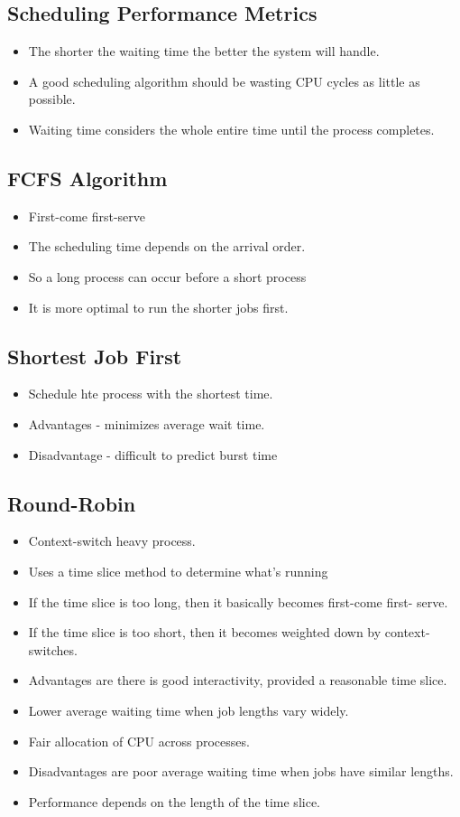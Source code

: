 \documentclass[]{article}
\begin{document}
\subsection{Scheduling Performance Metrics}
\begin{itemize}
\item The shorter the waiting time the better the system will handle.
\item A good scheduling algorithm should be wasting CPU cycles as little as
possible.
\item Waiting time considers the whole entire time until the process completes.
\end{itemize}

\subsection{FCFS Algorithm}
\begin{itemize}
\item First-come first-serve
\item The scheduling time depends on the arrival order.
\item So a long process can occur before a short process
\item It is more optimal to run the shorter jobs first.
\end{itemize}

\subsection{Shortest Job First}
\begin{itemize}
\item Schedule hte process with the shortest time.
\item Advantages - minimizes average wait time.
\item Disadvantage - difficult to predict burst time
\end{itemize}

\subsection{Round-Robin}
\begin{itemize}
\item Context-switch heavy process.
\item Uses a time slice method to determine what's running
\item If the time slice is too long, then it basically becomes first-come first-
serve.
\item If the time slice is too short, then it becomes weighted down by context-
switches.
\item Advantages are there is good interactivity, provided a reasonable time
slice.
\item Lower average waiting time when job lengths vary widely.
\item Fair allocation of CPU across processes.
\item Disadvantages are poor average waiting time when jobs have similar
lengths.
\item Performance depends on the length of the time slice.
\end{itemize}
\end{document}
